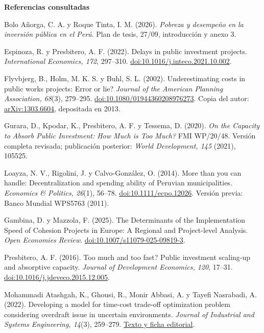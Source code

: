 \documentclass[11pt,a4paper]{article}
\begin{document}
\vspace{2pt}
{\small\textbf{Referencias consultadas}\par}
\begingroup\small\setlength{\parskip}{3pt}
Bolo Añorga, C. A. y Roque Tinta, I. M. (2026). \emph{Pobreza y desempeño en la inversión pública en el Perú}. Plan de tesis, 27/09, introducción y anexo 3.

Espinoza, R. y Presbitero, A. F. (2022). Delays in public investment projects. \emph{International Economics, 172}, 297--310. \href{https://doi.org/10.1016/j.inteco.2021.10.002}{doi:10.1016/j.inteco.2021.10.002}.

Flyvbjerg, B., Holm, M. K. S. y Buhl, S. L. (2002). Underestimating costs in public works projects: Error or lie? \emph{Journal of the American Planning Association, 68}(3), 279--295. \href{https://doi.org/10.1080/01944360208976273}{doi:10.1080/01944360208976273}. Copia del autor: \href{https://arxiv.org/abs/1303.6604}{arXiv:1303.6604}, depositada en 2013.

Gurara, D., Kpodar, K., Presbitero, A. F. y Tessema, D. (2020). \emph{On the Capacity to Absorb Public Investment: How Much is Too Much?} FMI WP/20/48. Versión completa revisada; publicación posterior: \emph{World Development, 145} (2021), 105525.

Loayza, N. V., Rigolini, J. y Calvo-González, O. (2014). More than you can handle: Decentralization and spending ability of Peruvian municipalities. \emph{Economics \& Politics, 26}(1), 56--78. \href{https://doi.org/10.1111/ecpo.12026}{doi:10.1111/ecpo.12026}. Versión previa: Banco Mundial WPS5763 (2011).

Gambina, D. y Mazzola, F. (2025). The Determinants of the Implementation Speed of Cohesion Projects in Europe: A Regional and Project-level Analysis. \emph{Open Economies Review}. \href{https://doi.org/10.1007/s11079-025-09819-3}{doi:10.1007/s11079-025-09819-3}.

Presbitero, A. F. (2016). Too much and too fast? Public investment scaling-up and absorptive capacity. \emph{Journal of Development Economics, 120}, 17--31. \href{https://doi.org/10.1016/j.jdeveco.2015.12.005}{doi:10.1016/j.jdeveco.2015.12.005}.

Mohammadi Atashgah, K., Ghousi, R., Monir Abbasi, A. y Tayefi Nasrabadi, A. (2022). Developing a model for time-cost trade-off optimization problem considering overdraft issue in uncertain environments. \emph{Journal of Industrial and Systems Engineering, 14}(3), 259--279. \href{https://www.jise.ir/article_154961.html}{Texto y ficha editorial}.
\endgroup
\end{document}
